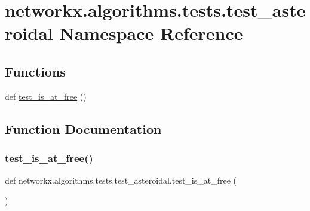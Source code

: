 \hypertarget{namespacenetworkx_1_1algorithms_1_1tests_1_1test__asteroidal}{}\section{networkx.\+algorithms.\+tests.\+test\+\_\+asteroidal Namespace Reference}
\label{namespacenetworkx_1_1algorithms_1_1tests_1_1test__asteroidal}
\subsection*{Functions}
\begin{DoxyCompactItemize}
\item 
def \hyperlink{namespacenetworkx_1_1algorithms_1_1tests_1_1test__asteroidal_a62f191de134c16cd7a6d4d2a8fe2e5d8}{test\+\_\+is\+\_\+at\+\_\+free} ()
\end{DoxyCompactItemize}


\subsection{Function Documentation}
\mbox{\label{namespacenetworkx_1_1algorithms_1_1tests_1_1test__asteroidal_a62f191de134c16cd7a6d4d2a8fe2e5d8}} 
\subsubsection{\texorpdfstring{test\+\_\+is\+\_\+at\+\_\+free()}{test\_is\_at\_free()}}
{\footnotesize\ttfamily def networkx.\+algorithms.\+tests.\+test\+\_\+asteroidal.\+test\+\_\+is\+\_\+at\+\_\+free (\begin{DoxyParamCaption}{ }\end{DoxyParamCaption})}

